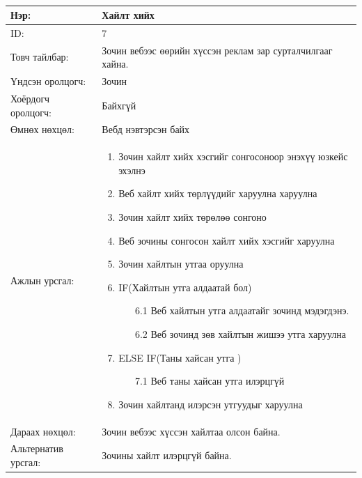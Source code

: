 \begin{center}
	\begin{table}[!htbp]
		\caption{} 
		\begin{tabular}{|p{4cm}|p{11cm}|}
			\hline
			Нэр: & Хайлт хийх  \\
			\hline
			ID: & 7 \\
			\hline
			Товч тайлбар: & Зочин вебээс өөрийн хүссэн реклам зар сурталчилгааг хайна.  \\
			\hline
			Үндсэн оролцогч: & Зочин \\
			\hline
			Хоёрдогч оролцогч: & Байхгүй  \\
			\hline
			Өмнөх нөхцөл: &  Вебд нэвтэрсэн байх \\
			\hline
			Ажлын урсгал: & \begin{enumerate}
								\item Зочин хайлт хийх хэсгийг сонгосоноор энэхүү юзкейс эхэлнэ
								\item Веб хайлт хийх төрлүүдийг харуулна харуулна
								\item Зочин хайлт хийх төрөлөө сонгоно
								\item Веб зочины сонгосон хайлт хийх хэсгийг харуулна
								\item Зочин хайлтын утгаа оруулна
								\item IF(Хайлтын утга алдаатай бол)
									\begin{enumerate}
										\item[6.1] Веб хайлтын утга алдаатайг зочинд мэдэгдэнэ.
										\item[6.2] Веб зочинд зөв хайлтын жишээ утга харуулна
									\end{enumerate}	
								\item ELSE IF(Таны хайсан утга )
									\begin{enumerate}
										\item[7.1] Веб таны хайсан утга илэрцгүй 
									\end{enumerate}
								\item Зочин хайлтанд илэрсэн утгуудыг харуулна
							\end{enumerate} 	\\
						\hline
			Дараах нөхцөл: & Зочин вебээс хүссэн хайлтаа олсон байна. \\
			\hline
			Альтернатив урсгал: & Зочины хайлт илэрцгүй байна.\\
			\hline
		\end{tabular}
	\end{table}
\end{center}

